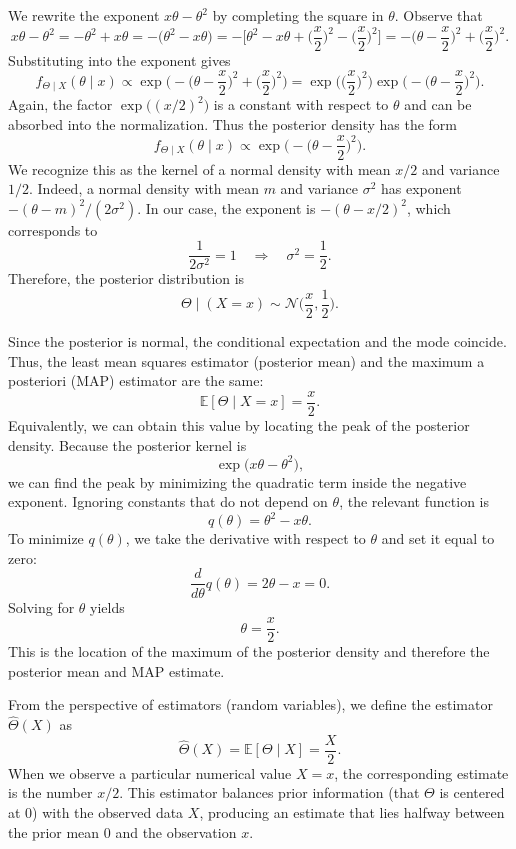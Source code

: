 We rewrite the exponent \(x\theta - \theta^{2}\) by completing the square in \(\theta\).  
Observe that
\[
x\theta - \theta^{2}
=
-\theta^{2} + x\theta
=
-\Big(\theta^{2} - x\theta\Big)
=
-\Big[\theta^{2} - x\theta + \Big(\frac{x}{2}\Big)^{2} - \Big(\frac{x}{2}\Big)^{2}\Big]
=
-\Big(\theta - \frac{x}{2}\Big)^{2}
+
\Big(\frac{x}{2}\Big)^{2}.
\]
Substituting into the exponent gives
\[
f_{\Theta\mid X}(\theta\mid x)
\propto
\exp\Big(-\Big(\theta - \frac{x}{2}\Big)^{2} + \Big(\frac{x}{2}\Big)^{2}\Big)
=
\exp\Big(\Big(\frac{x}{2}\Big)^{2}\Big)
\exp\Big(-\Big(\theta - \frac{x}{2}\Big)^{2}\Big).
\]
Again, the factor \(\exp\big((x/2)^{2}\big)\) is a constant with respect to \(\theta\) and can be absorbed into the normalization.  
Thus the posterior density has the form
\[
f_{\Theta\mid X}(\theta\mid x)
\propto
\exp\Big(-\Big(\theta - \frac{x}{2}\Big)^{2}\Big).
\]
We recognize this as the kernel of a normal density with mean \(x/2\) and variance \(1/2\).  
Indeed, a normal density with mean \(m\) and variance \(\sigma^{2}\) has exponent \(-(\theta-m)^{2}/(2\sigma^{2})\).  
In our case, the exponent is \(-(\theta - x/2)^{2}\), which corresponds to
\[
\frac{1}{2\sigma^{2}}
=
1
\quad\Rightarrow\quad
\sigma^{2}
=
\frac{1}{2}.
\]
Therefore, the posterior distribution is
\[
\Theta \mid (X = x)
\sim
\mathcal{N}\Big(\frac{x}{2}, \frac{1}{2}\Big).
\]

Since the posterior is normal, the conditional expectation and the mode coincide.  
Thus, the least mean squares estimator (posterior mean) and the maximum a posteriori (MAP) estimator are the same:
\[
\mathbb{E}[\Theta \mid X = x]
=
\frac{x}{2}.
\]
Equivalently, we can obtain this value by locating the peak of the posterior density.  
Because the posterior kernel is
\[
\exp\big(x\theta - \theta^{2}\big),
\]
we can find the peak by minimizing the quadratic term inside the negative exponent.  
Ignoring constants that do not depend on \(\theta\), the relevant function is
\[
q(\theta)
=
\theta^{2} - x\theta.
\]
To minimize \(q(\theta)\), we take the derivative with respect to \(\theta\) and set it equal to zero:
\[
\frac{d}{d\theta}q(\theta)
=
2\theta - x
=
0.
\]
Solving for \(\theta\) yields
\[
\theta
=
\frac{x}{2}.
\]
This is the location of the maximum of the posterior density and therefore the posterior mean and MAP estimate.

From the perspective of estimators (random variables), we define the estimator \(\hat{\Theta}(X)\) as
\[
\hat{\Theta}(X)
=
\mathbb{E}[\Theta \mid X]
=
\frac{X}{2}.
\]
When we observe a particular numerical value \(X = x\), the corresponding estimate is the number \(x/2\).  
This estimator balances prior information (that \(\Theta\) is centered at \(0\)) with the observed data \(X\), producing an estimate that lies halfway between the prior mean \(0\) and the observation \(x\).


